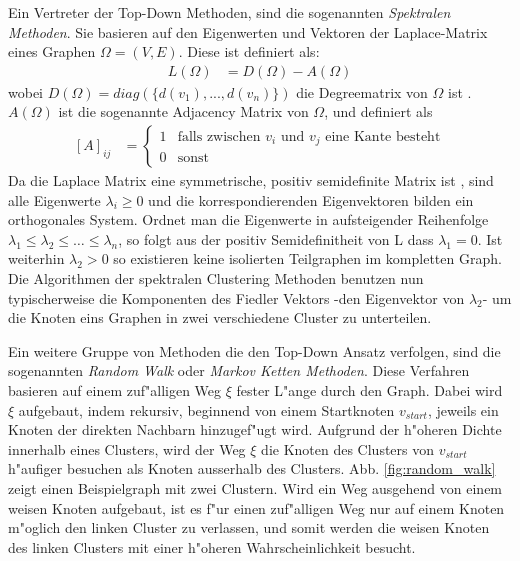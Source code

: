 \documentclass[journal]{vgtc}
\begin{document}
  Ein Vertreter der Top-Down Methoden, sind die sogenannten \emph{Spektralen Methoden}. Sie basieren auf den
  Eigenwerten und Vektoren der Laplace-Matrix eines Graphen $\Omega=(V,E)$. Diese ist definiert als:
  \begin{align}
    L(\Omega)&=D(\Omega)-A(\Omega)
  \end{align}
  wobei $D(\Omega)=diag(\{d(v_1), ..., d(v_n)\})$ die Degreematrix von $\Omega$ ist \cite{graphcontrol}.
  $A(\Omega)$ ist die sogenannte Adjacency Matrix von $\Omega$, und definiert als
  \begin{align}
   \left[A\right]_{ij}&= \begin{cases}
			    1 & \text{falls zwischen }v_i\text{ und }v_j\text{ eine Kante besteht}\\
			    0 & \text{sonst}
			  \end{cases}
  \end{align}
  Da die Laplace Matrix eine symmetrische, positiv semidefinite Matrix ist \cite{graphcontrol}, sind alle Eigenwerte $\lambda_i \ge 0$
  und die korrespondierenden Eigenvektoren bilden ein orthogonales System. Ordnet man die Eigenwerte in
  aufsteigender Reihenfolge $\lambda_1 \le \lambda_2 \le \dots \le \lambda_n$, so folgt aus der positiv Semidefinitheit
  von L dass $\lambda_1 = 0$. Ist weiterhin $\lambda_2 > 0$ so existieren keine isolierten Teilgraphen im kompletten
  Graph\cite{graphcontrol}. Die Algorithmen der spektralen Clustering Methoden benutzen nun typischerweise die Komponenten des Fiedler
  Vektors -den Eigenvektor von $\lambda_2$- um die Knoten eins Graphen in zwei verschiedene Cluster zu unterteilen\cite{Schaeffer}.

  Ein weitere Gruppe von Methoden die den Top-Down Ansatz verfolgen, sind die sogenannten \emph{Random Walk} oder
  \emph{Markov Ketten Methoden}. Diese Verfahren basieren auf einem zuf"alligen Weg $\xi$ fester L"ange durch den Graph.
  Dabei wird $\xi$ aufgebaut, indem rekursiv, beginnend von einem Startknoten $v_{start}$, jeweils ein Knoten
  der direkten Nachbarn hinzugef"ugt wird. Aufgrund der h"oheren Dichte innerhalb eines Clusters, wird der Weg
  $\xi$ die Knoten des Clusters von $v_{start}$ h"aufiger besuchen als Knoten ausserhalb des Clusters.
  Abb. \ref{fig:random_walk} zeigt einen Beispielgraph mit zwei Clustern. Wird ein Weg ausgehend von einem weisen
  Knoten aufgebaut, ist es f"ur einen zuf"alligen Weg nur auf einem Knoten m"oglich den linken Cluster zu verlassen,
  und somit werden die weisen Knoten des linken Clusters mit einer h"oheren Wahrscheinlichkeit besucht. 
\end{document}
